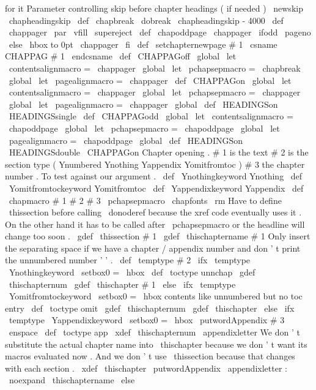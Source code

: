 {{for
it
%
Parameter
controlling
skip
before
chapter
headings
(
if
needed
)
\
newskip
\
chapheadingskip
\
def
\
chapbreak
{
\
dobreak
\
chapheadingskip
{
-
4000
}
}
\
def
\
chappager
{
\
par
\
vfill
\
supereject
}
\
def
\
chapoddpage
{
\
chappager
\
ifodd
\
pageno
\
else
\
hbox
to
0pt
{
}
\
chappager
\
fi
}
\
def
\
setchapternewpage
#
1
{
\
csname
CHAPPAG
#
1
\
endcsname
}
\
def
\
CHAPPAGoff
{
%
\
global
\
let
\
contentsalignmacro
=
\
chappager
\
global
\
let
\
pchapsepmacro
=
\
chapbreak
\
global
\
let
\
pagealignmacro
=
\
chappager
}
\
def
\
CHAPPAGon
{
%
\
global
\
let
\
contentsalignmacro
=
\
chappager
\
global
\
let
\
pchapsepmacro
=
\
chappager
\
global
\
let
\
pagealignmacro
=
\
chappager
\
global
\
def
\
HEADINGSon
{
\
HEADINGSsingle
}
}
\
def
\
CHAPPAGodd
{
%
\
global
\
let
\
contentsalignmacro
=
\
chapoddpage
\
global
\
let
\
pchapsepmacro
=
\
chapoddpage
\
global
\
let
\
pagealignmacro
=
\
chapoddpage
\
global
\
def
\
HEADINGSon
{
\
HEADINGSdouble
}
}
\
CHAPPAGon
%
Chapter
opening
.
%
%
#
1
is
the
text
#
2
is
the
section
type
(
Ynumbered
Ynothing
%
Yappendix
Yomitfromtoc
)
#
3
the
chapter
number
.
%
%
To
test
against
our
argument
.
\
def
\
Ynothingkeyword
{
Ynothing
}
\
def
\
Yomitfromtockeyword
{
Yomitfromtoc
}
\
def
\
Yappendixkeyword
{
Yappendix
}
%
\
def
\
chapmacro
#
1
#
2
#
3
{
%
\
pchapsepmacro
{
%
\
chapfonts
\
rm
%
%
Have
to
define
\
thissection
before
calling
\
donoderef
because
the
%
xref
code
eventually
uses
it
.
On
the
other
hand
it
has
to
be
called
%
after
\
pchapsepmacro
or
the
headline
will
change
too
soon
.
\
gdef
\
thissection
{
#
1
}
%
\
gdef
\
thischaptername
{
#
1
}
%
%
%
Only
insert
the
separating
space
if
we
have
a
chapter
/
appendix
%
number
and
don
'
t
print
the
unnumbered
number
'
'
.
\
def
\
temptype
{
#
2
}
%
\
ifx
\
temptype
\
Ynothingkeyword
\
setbox0
=
\
hbox
{
}
%
\
def
\
toctype
{
unnchap
}
%
\
gdef
\
thischapternum
{
}
%
\
gdef
\
thischapter
{
#
1
}
%
\
else
\
ifx
\
temptype
\
Yomitfromtockeyword
\
setbox0
=
\
hbox
{
}
%
contents
like
unnumbered
but
no
toc
entry
\
def
\
toctype
{
omit
}
%
\
gdef
\
thischapternum
{
}
%
\
gdef
\
thischapter
{
}
%
\
else
\
ifx
\
temptype
\
Yappendixkeyword
\
setbox0
=
\
hbox
{
\
putwordAppendix
{
}
#
3
\
enspace
}
%
\
def
\
toctype
{
app
}
%
\
xdef
\
thischapternum
{
\
appendixletter
}
%
%
We
don
'
t
substitute
the
actual
chapter
name
into
\
thischapter
%
because
we
don
'
t
want
its
macros
evaluated
now
.
And
we
don
'
t
%
use
\
thissection
because
that
changes
with
each
section
.
%
\
xdef
\
thischapter
{
\
putwordAppendix
{
}
\
appendixletter
:
\
noexpand
\
thischaptername
}
%
\
else
}}}}

